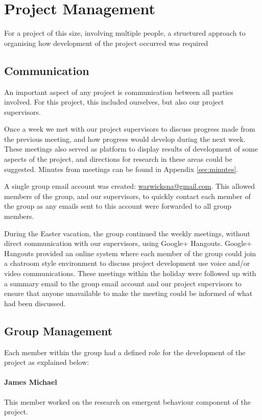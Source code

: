 \section{Project Management}
For a project of this size, involving multiple people, a structured approach to organising how development of the project occurred was required

\subsection{Communication}
An important aspect of any project is communication between all parties involved. For this project, this included ourselves, but also our project supervisors.

Once a week we met with our project supervisors to discuss progress made from the previous meeting, and how progress would develop during the next week. These meetings also served as platform to display results of development of some aspects of the project, and directions for research in these areas could be suggested. Minutes from meetings can be found in Appendix \ref{sec:minutes}.

A single group email account was created: \href{mailto:warwicksna@gmail.com}{warwicksna@gmail.com}. This allowed members of the group, and our supervisors, to quickly contact each member of the group as any emails sent to this account were forwarded to all group members.

During the Easter vacation, the group continued the weekly meetings, without direct communication with our supervisors, using Google+ Hangouts. Google+ Hangouts provided an online system where each member of the group could join a chatroom style environment to discuss project development use voice and/or video communications. These meetings within the holiday were followed up with a summary email to the group email account and our project supervisors to ensure that anyone unavailable to make the meeting could be informed of what had been discussed.

\subsection{Group Management}
Each member within the group had a defined role for the development of the project as explained below:

\paragraph{James Michael}
This member worked on the research on emergent behaviour component of the project.


